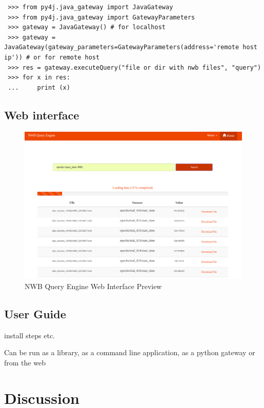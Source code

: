 \documentclass[utf8]{frontiersSCNS} %
\begin{document}
\begin{lstlisting}
 >>> from py4j.java_gateway import JavaGateway
 >>> from py4j.java_gateway import GatewayParameters
 >>> gateway = JavaGateway() # for localhost
 >>> gateway = JavaGateway(gateway_parameters=GatewayParameters(address='remote host ip')) # or for remote host
 >>> res = gateway.executeQuery("file or dir with nwb files", "query")
 >>> for x in res:
 ...     print (x)
\end{lstlisting}

\subsection{Web interface}
\label{web_interface}

\begin{figure}
  \includegraphics[width=17cm]{nwb-query-engine-web}
\caption{NWB Query Engine Web Interface Preview}
\label{fig:diagram}
\end{figure}

\subsection{User Guide}
install steps etc.

Can be run as a library, as a command line application, as a python gateway or from the web

\section{Discussion}
\label{Discussion}
\end{document}

